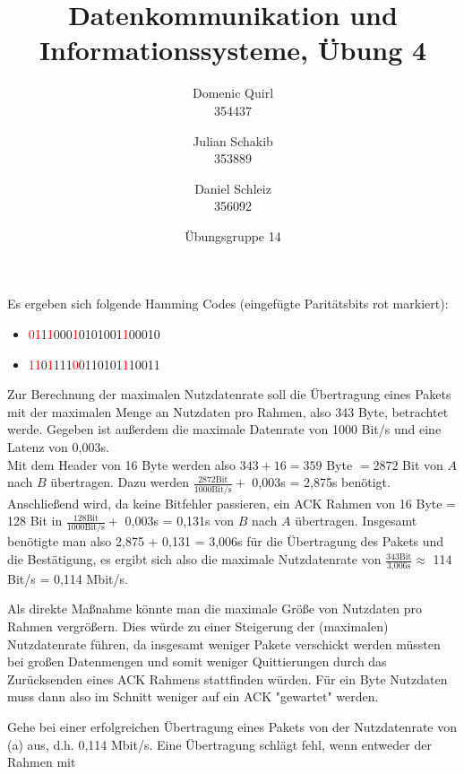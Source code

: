 \documentclass{../exercisesheet}
\title{Datenkommunikation und Informationssysteme, Übung 4}
\author{
    Domenic Quirl \\ 354437
    \and
    Julian Schakib \\ 353889
    \and 
    Daniel Schleiz \\ 356092
}
\date{Übungsgruppe 14}
\begin{document}
\maketitle
\pointtable


\begin{exercise}{1}
	Es ergeben sich folgende Hamming Codes (eingefügte Paritätsbits rot markiert):
	\begin{itemize}
	\item \textcolor{red}{01}1\textcolor{red}{1}000\textcolor{red}{1}0101001\textcolor{red}{1}00010
	\item \textcolor{red}{11}0\textcolor{red}{1}111\textcolor{red}{0}0110101\textcolor{red}{1}10011
	\end{itemize}
\end{exercise}

\begin{exercise}{4}
\begin{subexercise}
	Zur Berechnung der maximalen Nutzdatenrate soll die Übertragung eines Pakets mit der maximalen Menge an Nutzdaten pro Rahmen, also 343 Byte, betrachtet werde. Gegeben ist
	außerdem die maximale Datenrate von 1000 Bit/s und eine Latenz von 0,003s. \\
	Mit dem Header von 16 Byte werden also $343+16=359$ Byte $= 2872$ Bit von $A$ nach $B$ übertragen. Dazu werden $\frac{2872 \text{Bit}}{1000 \text{Bit/s}} +$ 0,003s 
	= 2,875s benötigt. Anschließend wird, da keine Bitfehler passieren, ein ACK Rahmen von 16 Byte = 128 Bit in $\frac{128 \text{Bit}}{1000 \text{Bit/s}} +$ 0,003s = 0,131s von
	$B$ nach $A$ übertragen. Insgesamt benötigte man also 2,875 + 0,131 = 3,006s für die Übertragung des Pakets und die Bestätigung, es ergibt sich also die maximale
	Nutzdatenrate von $\frac{343\text{Bit}}{\text{3,006s}}\approx$ 114 Bit/s = 0,114 Mbit/s.
\end{subexercise}
\begin{subexercise}
	Als direkte Maßnahme könnte man die maximale Größe von Nutzdaten pro Rahmen vergrößern. Dies würde zu einer Steigerung der (maximalen) Nutzdatenrate führen, da 
	insgesamt weniger Pakete verschickt werden müssten bei großen Datenmengen und somit weniger Quittierungen durch das Zurücksenden eines ACK Rahmens stattfinden
	würden. Für ein Byte Nutzdaten muss dann also im Schnitt weniger auf ein ACK "gewartet" werden.
\end{subexercise}
\begin{subexercise}
	Gehe bei einer erfolgreichen Übertragung eines Pakets von der Nutzdatenrate von (a) aus, d.h. 0,114 Mbit/s. Eine Übertragung schlägt fehl, wenn entweder der Rahmen mit

\end{subexercise}
\end{exercise}
\end{document}
